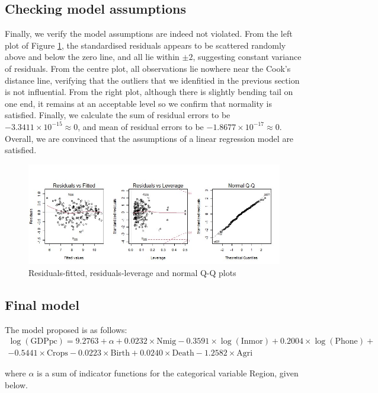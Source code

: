 \documentclass[12pt,a4paper]{article}
\renewcommand\texttt[1]{{\ttfamily\color{ttcolor}#1}}
\begin{document}
\subsection{Checking model assumptions}
Finally, we verify the model assumptions are indeed not violated. From the left plot of Figure \ref{ass}, the standardised residuals appears to be scattered randomly above and below the zero line, and all lie within $\pm2$, suggesting constant variance of residuals. From the centre plot, all observations lie nowhere near the Cook's distance line, verifying that the outliers that we idenfitied in the previous section is not influential. From the right plot, although there is slightly bending tail on one end, it remains at an acceptable level so we confirm that normality is satisfied. Finally, we calculate the sum of residual errors to be $-3.3411 \times 10^{-15} \approx 0$, and mean of residual errors to be $-1.8677 \times 10^{-17} \approx 0$. Overall, we are convinced that the assumptions of a linear regression model are satisfied.

\begin{figure}[h]
\includegraphics[width=1\linewidth]{final3}
\caption{Residuals-fitted, residuals-leverage and normal Q-Q plots}
\label{ass}
\end{figure}

\pagebreak
\subsection{Final model} \label{model}
The model proposed is as follows: 
\begin{multline*}
\log(\text{GDPpc}) =9.2763 +\alpha +0.0232 \times \text{Nmig} - 0.3591 \times \log(\text{Inmor}) +0.2004 \times \log(\text{Phone}) + \\ 
- 0.5441 \times \text{Crops} - 0.0223 \times \text{Birth} +0.0240 \times \text{Death} - 1.2582 \times \text{Agri}
\end{multline*}

where $\alpha$ is a sum of indicator functions for the categorical variable \texttt{Region}, given below. 
\end{document}
